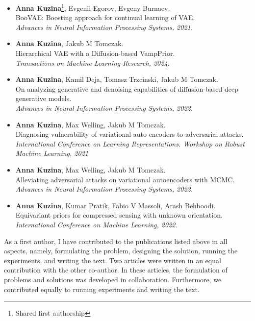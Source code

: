 \begin{itemize}[leftmargin=15pt, rightmargin=10pt]
    \item \textbf{Anna Kuzina}\footnote[1]{Shared first authorship}, Evgenii Egorov\footnotemark[1], Evgeny Burnaev. \\
    BooVAE: Boosting approach for continual learning of VAE. \\
    \textit{Advances in Neural Information Processing Systems, 2021.}
    \item  \textbf{Anna Kuzina},  Jakub M Tomczak. \\ 
    Hierarchical VAE with a Diffusion-based VampPrior.\\
    \textit{Transactions on Machine Learning Research, 2024.}
    \item \textbf{Anna Kuzina}\footnotemark[1], Kamil Deja\footnotemark[1], Tomasz Trzcinski, Jakub M Tomczak. \\
    On analyzing generative and denoising capabilities of diffusion-based deep generative models. \\
    \textit{Advances in Neural Information Processing Systems, 2022.}
    \item \textbf{Anna Kuzina}, Max Welling, Jakub M Tomczak.  \\
    Diagnosing vulnerability of variational auto-encoders to adversarial attacks. \\
    \textit{International Conference on Learning Representations. Workshop on Robust Machine Learning, 2021}
    \item \textbf{Anna Kuzina}, Max Welling, Jakub M Tomczak.  \\
    Alleviating adversarial attacks on variational autoencoders with MCMC. \\
    \textit{Advances in Neural Information Processing Systems, 2022.}
    \item \textbf{Anna Kuzina}, Kumar Pratik, Fabio V Massoli, Arash Behboodi.\\ 
    Equivariant priors for compressed sensing with unknown orientation. \\
    \textit{International Conference on Machine Learning, 2022.}
\end{itemize}

As a first author, I have contributed to the publications listed above in all aspects, namely, formulating the problem, designing the solution, running the experiments, and writing the text. 
Two articles were written in an equal contribution with the other co-author.  
In these articles, the formulation of problems and solutions was developed in collaboration. Furthermore, we contributed equally to running experiments and writing the text.

